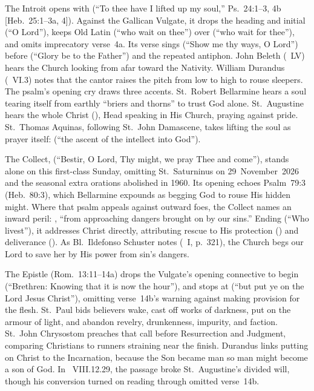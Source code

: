 The Introit opens with  (``To thee have I lifted up my soul,'' Ps.~24:1--3, 4b [Heb.~25:1--3a, 4]). Against the Gallican Vulgate, it drops the heading and initial  (``O Lord''), keeps Old Latin  (``who wait on thee'') over  (``who wait for thee''), and omits imprecatory verse~4a. Its verse sings  (``Show me thy ways, O Lord'') before  (``Glory be to the Father'') and the repeated antiphon. John Beleth (~LV) hears the Church looking from afar toward the Nativity. William Durandus (~VI.3) notes that the cantor raises the pitch from low to high to rouse sleepers. The psalm's opening cry draws three accents. St.~Robert Bellarmine hears a soul tearing itself from earthly ``briers and thorns'' to trust God alone. St.~Augustine hears the whole Christ (), Head speaking in His Church, praying against pride. St.~Thomas Aquinas, following St.~John Damascene, takes lifting the soul as prayer itself:  (``the ascent of the intellect into God'').

The Collect,  (``Bestir, O Lord, Thy might, we pray Thee and come''), stands alone on this first-class Sunday, omitting St.~Saturninus on 29~November~2026 and the seasonal extra orations abolished in 1960. Its opening echoes Psalm~79:3 (Heb.~80:3), which Bellarmine expounds as begging God to rouse His hidden might. Where that psalm appeals against outward foes, the Collect names an inward peril: , ``from approaching dangers brought on by our sins.'' Ending  (``Who livest''), it addresses Christ directly, attributing rescue to His protection () and deliverance (). As Bl.~Ildefonso Schuster notes (~I, p.~321), the Church begs our Lord to save her by His power from sin's dangers.

The Epistle (Rom.~13:11--14a) drops the Vulgate's opening connective to begin  (``Brethren: Knowing that it is now the hour''), and stops at  (``but put ye on the Lord Jesus Christ''), omitting verse~14b's warning against making provision for the flesh. St.~Paul bids believers wake, cast off works of darkness, put on the armour of light, and abandon revelry, drunkenness, impurity, and faction. St.~John Chrysostom preaches that call before Resurrection and Judgment, comparing Christians to runners straining near the finish. Durandus links putting on Christ to the Incarnation, because the Son became man so man might become a son of God. In ~VIII.12.29, the passage broke St.~Augustine's divided will, though his conversion turned on reading through omitted verse~14b.

